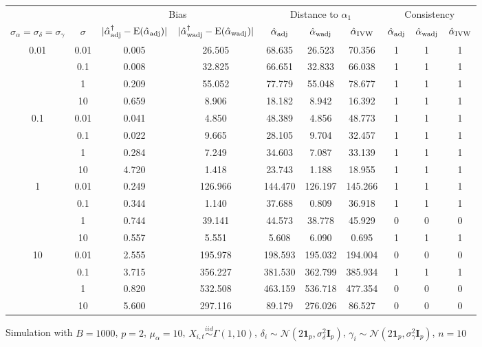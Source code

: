 \documentclass[11pt]{article}
\newcommand{\simiid}{\stackrel{iid}{\sim}} %
\def\normal#1#2{\mathcal{N}(#1,#2)} %
\def\E#1{\mathrm{E}(#1)} %
\theoremstyle{definition}
\begin{document}
\begin{sidewaysfigure}
 \caption{Simulation  with $B = 1000$, $p = 2$, $\mu_{\alpha}=10$, $X_{i,t} \simiid \Gamma(1,10)$, $\delta_i \sim \normal{2\mathbf{1}_p}{\sigma^2_{\delta}\mathbf{I}_p}$, $\gamma_i \sim \normal{2\mathbf{1}_p}{\sigma^2_{\gamma}\mathbf{I}_p}$, $n = 10$} \vspace{.2cm}
\centering
\begin{tabular}{cc|cc|ccc|ccc}
&  & \multicolumn{2}{c|}{Bias} & \multicolumn{3}{c|}{Distance to $\alpha_1$} & \multicolumn{3}{c}{Consistency} \\ 
$\sigma_{\alpha} = \sigma_{\delta}=\sigma_{\gamma}$ & $\sigma$ & $|\hat{\alpha}_{\rm adj}^{\dagger}-\E{\hat{\alpha}_{\rm adj}}|$ & $|\hat{\alpha}_{\rm wadj}^{\dagger}-\E{\hat{\alpha}_{\rm wadj}}|$ & $\hat{\alpha}_{\rm adj}$ & $\hat{\alpha}_{\rm wadj}$ & $\hat{\alpha}_{\rm IVW}$ & $\hat{\alpha}_{\rm adj}$ & $\hat{\alpha}_{\rm wadj}$ & $\hat{\alpha}_{\rm IVW}$ \\[.3cm] 
\multirow{4}{*}{0.01} &0.01 & 0.005 & 26.505 & 68.635 & 26.523 & 70.356 & 1  & 1  & 1  \\ 
 &  0.1 & 0.008 & 32.825 & 66.651 & 32.833 & 66.038 & 1  & 1  & 1  \\ 
 &  1 & 0.209 & 55.052 & 77.779 & 55.048 & 78.677 & 1  & 1  & 1  \\ 
 &  10 & 0.659 & 8.906 & 18.182 & 8.942 & 16.392 & 1  & 1  & 1 \\[.3cm] 
\multirow{4}{*}{0.1} &  0.01 & 0.041 & 4.850 & 48.389 & 4.856 & 48.773 & 1  & 1  & 1  \\ 
 &  0.1 & 0.022 & 9.665 & 28.105 & 9.704 & 32.457 & 1  & 1  & 1  \\ 
 &  1 & 0.284 & 7.249 & 34.603 & 7.087 & 33.139 & 1  & 1  & 1  \\ 
 &  10 & 4.720 & 1.418 & 23.743 & 1.188 & 18.955 & 1  & 1  & 1  \\[.3cm] 
\multirow{4}{*}{1} &  0.01 & 0.249 & 126.966 & 144.470 & 126.197 & 145.266 & 1  & 1  & 1  \\ 
 &  0.1 & 0.344 & 1.140 & 37.688 & 0.809 & 36.918 & 1  & 1  & 1  \\ 
 &  1 & 0.744 & 39.141 & 44.573 & 38.778 & 45.929 & 0  & 0  & 0  \\ 
 &  10 & 0.557 & 5.551 & 5.608 & 6.090 & 0.695 & 1  & 1  & 1  \\[.3cm] 
\multirow{4}{*}{10} &  0.01 & 2.555 & 195.978 & 198.593 & 195.032 & 194.004 & 0  & 0  & 0  \\ 
 &  0.1 & 3.715 & 356.227 & 381.530 & 362.799 & 385.934 & 1  & 1  & 1  \\ 
 &  1 & 0.820 & 532.508 & 463.159 & 536.718 & 477.354 & 0  & 0  & 0  \\ 
 &  10 & 5.600 & 297.116 & 89.179 & 276.026 & 86.527 & 0  & 0  & 0  \\ 
\end{tabular}
\end{sidewaysfigure}
\end{document}
